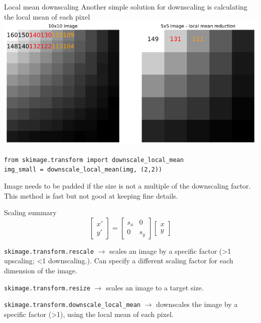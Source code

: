 \documentclass[9pt, aspectratio=169]{beamer}
\begin{document}
\begin{frame}
    {Local mean downscaling}
    Another simple solution for downscaling is calculating the local mean of each pixel
    \centering
    \includegraphics[width=.65\textwidth]{downscale.png}
    \pause
    \begin{codebox}
        \texttt{from skimage.transform import downscale\_local\_mean\\
            img\_small = downscale\_local\_mean(img, (2,2))}
    \end{codebox}

    Image needs to be padded if the size is not a multiple of the downscaling factor.\\
    This method is fast but not good at keeping fine details.
\end{frame}

\begin{frame}
    {Scaling summary}
    $$\begin{bmatrix}x'\\y'\end{bmatrix} = \begin{bmatrix}s_x&0\\0&s_y\end{bmatrix}\begin{bmatrix}x\\y\end{bmatrix}$$

    \texttt{skimage.transform.rescale} $\rightarrow$ scales an image by a specific factor (>1 upscaling; <1 downscaling.). Can specify a different scaling factor for each dimension of the image.
    \vspace{2em}

    \texttt{skimage.transform.resize} $\rightarrow$ scales an image to a target size.
    \vspace{2em}

    \texttt{skimage.transform.downscale\_local\_mean} $\rightarrow$ downscales the image by a specific factor (>1), using the local mean of each pixel.
\end{frame}
\end{document}
